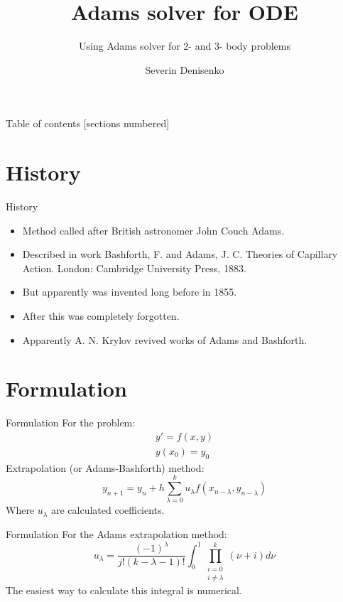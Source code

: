 \documentclass[10pt]{beamer}
\title{Adams solver for ODE}
\subtitle{Using Adams solver for 2- and 3- body problems}
\date{}
\author{Severin Denisenko}
\institute{Saint Petersburg State University}
\begin{document}
\maketitle

\begin{frame}{Table of contents}
  [sections numbered]
  \tableofcontents%
\end{frame}

\section[History]{History}

\begin{frame}{History}
	\begin{itemize}
		\item Method called after British astronomer John Couch Adams.
		\item Described in work Bashforth, F. and Adams, J. C. Theories of Capillary Action. London: Cambridge University Press, 1883.
		\item But apparently was invented long before in 1855.
		\item After this was completely forgotten.
        \item Apparently A. N. Krylov revived works of Adams and Bashforth.
	\end{itemize}
\end{frame}

\section[Formulation]{Formulation}

\begin{frame}{Formulation}
  For the problem:
  \begin{gather*}
      y'=f(x,y) \\
      y(x_0)=y_0
  \end{gather*}
  Extrapolation (or Adams-Bashforth) method:
  \begin{equation}
      y_{n+1} = y_n + h \sum_{\lambda=0}^{k} u_{\lambda}f(x_{n-\lambda}, y_{n-\lambda})
  \end{equation}
  Where $u_{\lambda}$ are calculated coefficients.
\end{frame}

\begin{frame}{Formulation}
  For the Adams extrapolation method:
  \begin{equation*}
      u_{\lambda} = \frac{(-1)^\lambda}{j!(k-\lambda-1)!} \int_{0}^{1} \prod_{ \substack{i=0 \\ i\neq\lambda}}^{k} (\nu+i) d \nu
  \end{equation*}
  The easiest way to calculate this integral is numerical.
\end{frame}
\end{document}
